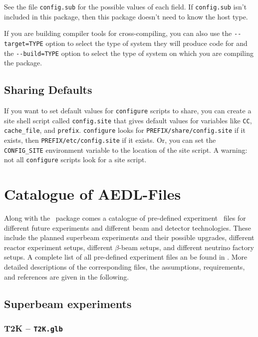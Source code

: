 \begin{appendix}
See the file \verb+config.sub+ for the possible values of each field.  If
\verb+config.sub+ isn't included in this package, then this package doesn't
need to know the host type.

   If you are building compiler tools for cross-compiling, you can also
use the \verb+--target=TYPE+ option to select the type of system they will
produce code for and the \verb+--build=TYPE+ option to select the type of
system on which you are compiling the package.

\section*{Sharing Defaults}

   If you want to set default values for \verb+configure+ scripts to share,
you can create a site shell script called \verb+config.site+ that gives
default values for variables like \verb+CC+, \verb+cache_file+, and \verb+prefix+.
\verb+configure+ looks for \verb+PREFIX/share/config.site+ if it exists, then
\verb+PREFIX/etc/config.site+ if it exists.  Or, you can set the
\verb+CONFIG_SITE+ environment variable to the location of the site script.
A warning: not all \verb+configure+ scripts look for a site script.




\chapter{Catalogue of {\sf AEDL}-Files}
\label{app:aedlfiles}
Along with the \GLOBES\ package comes a catalogue of pre-defined experiment \AEDL\ files for different
future experiments and different beam and detector technologies. These include the planned superbeam experiments
and their possible upgrades, different reactor experiment setups, different $\beta$-beam setups, and different 
neutrino factory setups. A complete list
of all pre-defined experiment files an be found in . More detailed descriptions of the
corresponding files, the assumptions, requirements, and references are given in the following. 
   
\section*{Superbeam experiments}
\subsection*{T2K -- {\tt T2K.glb}}


\end{appendix}

